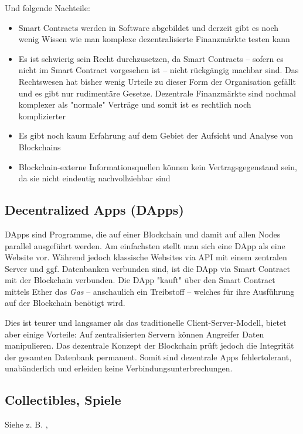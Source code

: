 Und folgende Nachteile:
\begin{itemize}
\item Smart Contracts werden in Software abgebildet und derzeit gibt es noch wenig Wissen wie man komplexe dezentralisierte Finanzmärkte testen kann
\item Es ist schwierig sein Recht durchzusetzen, da Smart Contracts -- sofern es nicht im Smart Contract vorgesehen ist -- nicht rückgängig machbar sind. Das Rechtswesen hat bisher wenig Urteile zu dieser Form der Organisation gefällt und es gibt nur rudimentäre Gesetze. Dezentrale Finanzmärkte sind nochmal komplexer als "normale" Verträge und somit ist es rechtlich noch komplizierter
\item Es gibt noch kaum Erfahrung auf dem Gebiet der Aufsicht und Analyse von Blockchains
\item Blockchain-externe Informationsquellen können kein Vertragsgegenstand sein, da sie nicht eindeutig nachvollziehbar sind
\end{itemize}


\subsection{Decentralized Apps (DApps)}\label{l_dapps}
DApps sind Programme, die auf einer Blockchain und damit auf allen Nodes parallel ausgeführt werden. Am einfachsten stellt man sich eine DApp als eine Website vor. Während jedoch klassische Websites via API mit einem zentralen Server und ggf. Datenbanken verbunden sind, ist die DApp via Smart Contract mit der Blockchain verbunden. Die DApp "kauft" über den Smart Contract mittels Ether das \textit{Gas} -- anschaulich ein Treibstoff -- welches für ihre Ausführung auf der Blockchain benötigt wird.

Dies ist teurer und langsamer als das traditionelle Client-Server-Modell, bietet aber einige Vorteile: Auf zentralisierten Servern können Angreifer Daten manipulieren. Das dezentrale Konzept der Blockchain prüft jedoch die Integrität der gesamten Datenbank permanent. Somit sind dezentrale Apps fehlertolerant, unabänderlich und erleiden keine Verbindungsunterbrechungen.

\cite[vgl. Wikipedia, Smart Contracts]{Smart_Contract_Wikipedia}

\subsection{Collectibles, Spiele}
Siehe z. B. \cite[CryptoKitties]{CryptoKitties}, \cite[0xUniverse]{0xUniverse}

